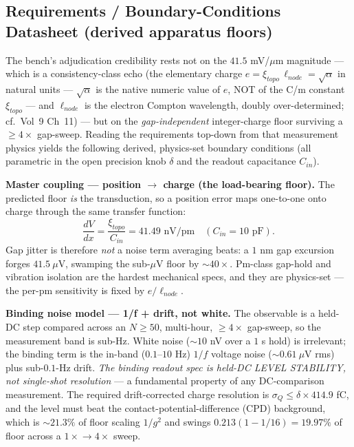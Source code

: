 \subsection{Requirements / Boundary-Conditions Datasheet (derived apparatus floors)}

The bench's adjudication credibility rests not on the $41.5$ mV/$\mu$m magnitude --- which is a consistency-class echo (the elementary charge $e = \xi_{topo}\,\ell_{node} = \sqrt{\alpha}$ in natural units --- $\sqrt{\alpha}$ is the native numeric value of $e$, NOT of the C/m constant $\xi_{topo}$ --- and $\ell_{node}$ is the electron Compton wavelength, doubly over-determined; cf.\ Vol~9 Ch~11) --- but on the \emph{gap-independent} integer-charge floor surviving a $\ge 4\times$ gap-sweep. Reading the requirements top-down from that measurement physics yields the following derived, physics-set boundary conditions (all parametric in the open precision knob $\delta$ and the readout capacitance $C_{in}$).

\textbf{Master coupling --- position $\to$ charge (the load-bearing floor).} The predicted floor \emph{is} the transduction, so a position error maps one-to-one onto charge through the same transfer function:
\begin{equation}
    \frac{dV}{dx} = \frac{\xi_{topo}}{C_{in}} = 41.49 \text{ nV/pm} \quad (C_{in} = 10 \text{ pF}).
\end{equation}
Gap jitter is therefore \emph{not} a noise term averaging beats: a $1$ nm gap excursion forges $41.5\ \mu$V, swamping the sub-$\mu$V floor by $\sim 40\times$. Pm-class gap-hold and vibration isolation are the hardest mechanical specs, and they are physics-set --- the per-pm sensitivity is fixed by $e/\ell_{node}$.

\textbf{Binding noise model --- 1/f + drift, not white.} The observable is a held-DC step compared across an $N \ge 50$, multi-hour, $\ge 4\times$ gap-sweep, so the measurement band is sub-Hz. White noise ($\sim 10$ nV over a $1$ s hold) is irrelevant; the binding term is the in-band ($0.1$--$10$ Hz) $1/f$ voltage noise ($\sim 0.61\ \mu$V rms) plus sub-$0.1$-Hz drift. \emph{The binding readout spec is held-DC LEVEL STABILITY, not single-shot resolution} --- a fundamental property of any DC-comparison measurement. The required drift-corrected charge resolution is $\sigma_Q \le \delta \times 414.9$ fC, and the level must beat the contact-potential-difference (CPD) background, which is $\sim 21.3\%$ of floor scaling $1/g^2$ and swings $0.213(1 - 1/16) = 19.97\%$ of floor across a $1\times \! \to \! 4\times$ sweep.

